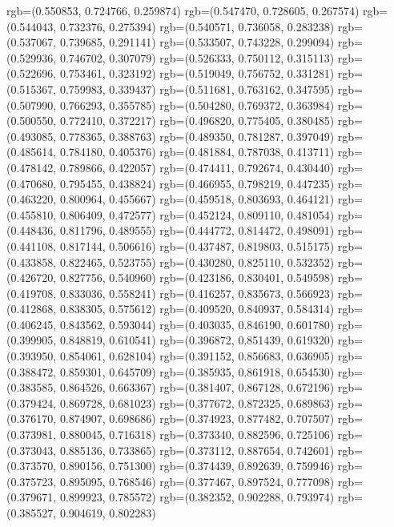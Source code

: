 {{{					rgb=(0.550853, 0.724766, 0.259874)
					rgb=(0.547470, 0.728605, 0.267574)
					rgb=(0.544043, 0.732376, 0.275394)
					rgb=(0.540571, 0.736058, 0.283238)
					rgb=(0.537067, 0.739685, 0.291141)
					rgb=(0.533507, 0.743228, 0.299094)
					rgb=(0.529936, 0.746702, 0.307079)
					rgb=(0.526333, 0.750112, 0.315113)
					rgb=(0.522696, 0.753461, 0.323192)
					rgb=(0.519049, 0.756752, 0.331281)
					rgb=(0.515367, 0.759983, 0.339437)
					rgb=(0.511681, 0.763162, 0.347595)
					rgb=(0.507990, 0.766293, 0.355785)
					rgb=(0.504280, 0.769372, 0.363984)
					rgb=(0.500550, 0.772410, 0.372217)
					rgb=(0.496820, 0.775405, 0.380485)
					rgb=(0.493085, 0.778365, 0.388763)
					rgb=(0.489350, 0.781287, 0.397049)
					rgb=(0.485614, 0.784180, 0.405376)
					rgb=(0.481884, 0.787038, 0.413711)
					rgb=(0.478142, 0.789866, 0.422057)
					rgb=(0.474411, 0.792674, 0.430440)
					rgb=(0.470680, 0.795455, 0.438824)
					rgb=(0.466955, 0.798219, 0.447235)
					rgb=(0.463220, 0.800964, 0.455667)
					rgb=(0.459518, 0.803693, 0.464121)
					rgb=(0.455810, 0.806409, 0.472577)
					rgb=(0.452124, 0.809110, 0.481054)
					rgb=(0.448436, 0.811796, 0.489555)
					rgb=(0.444772, 0.814472, 0.498091)
					rgb=(0.441108, 0.817144, 0.506616)
					rgb=(0.437487, 0.819803, 0.515175)
					rgb=(0.433858, 0.822465, 0.523755)
					rgb=(0.430280, 0.825110, 0.532352)
					rgb=(0.426720, 0.827756, 0.540960)
					rgb=(0.423186, 0.830401, 0.549598)
					rgb=(0.419708, 0.833036, 0.558241)
					rgb=(0.416257, 0.835673, 0.566923)
					rgb=(0.412868, 0.838305, 0.575612)
					rgb=(0.409520, 0.840937, 0.584314)
					rgb=(0.406245, 0.843562, 0.593044)
					rgb=(0.403035, 0.846190, 0.601780)
					rgb=(0.399905, 0.848819, 0.610541)
					rgb=(0.396872, 0.851439, 0.619320)
					rgb=(0.393950, 0.854061, 0.628104)
					rgb=(0.391152, 0.856683, 0.636905)
					rgb=(0.388472, 0.859301, 0.645709)
					rgb=(0.385935, 0.861918, 0.654530)
					rgb=(0.383585, 0.864526, 0.663367)
					rgb=(0.381407, 0.867128, 0.672196)
					rgb=(0.379424, 0.869728, 0.681023)
					rgb=(0.377672, 0.872325, 0.689863)
					rgb=(0.376170, 0.874907, 0.698686)
					rgb=(0.374923, 0.877482, 0.707507)
					rgb=(0.373981, 0.880045, 0.716318)
					rgb=(0.373340, 0.882596, 0.725106)
					rgb=(0.373043, 0.885136, 0.733865)
					rgb=(0.373112, 0.887654, 0.742601)
					rgb=(0.373570, 0.890156, 0.751300)
					rgb=(0.374439, 0.892639, 0.759946)
					rgb=(0.375723, 0.895095, 0.768546)
					rgb=(0.377467, 0.897524, 0.777098)
					rgb=(0.379671, 0.899923, 0.785572)
					rgb=(0.382352, 0.902288, 0.793974)
					rgb=(0.385527, 0.904619, 0.802283)
}}}
